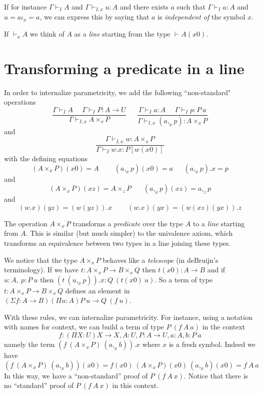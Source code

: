 \documentclass[10pt,a4paper]{article}
\begin{document}
 If for instance $\Gamma\vdash_I A$ and $\Gamma\vdash_{I,x} u:A$ and there exists $a$
such that $\Gamma\vdash_I a :A$ and $u = a\iota_x = a$, we can express this by saying that
$a$ is {\em independent of} the symbol $x$.

\medskip

 If $\vdash_{x} A$ we think of $A$ as a {\em line} starting from the type $\vdash_{} A(x0)$.

\section{Transforming a predicate in a line}


 In order to internalize parametricity, we add the following ``non-standard" operations
$$
\frac{\Gamma\vdash_I A~~~~~~\Gamma\vdash_I P:A\rightarrow U}{\Gamma\vdash_{I,x} A\times_x P}~~~~~~~
\frac{\Gamma\vdash_I a:A~~~~~~\Gamma\vdash_I p:P~a}{\Gamma\vdash_{I,x} (a,_xp):A\times_x P}
$$
and
$$
\frac{\Gamma\vdash_{I,x} w:A\times_x P}{\Gamma\vdash_I w.x:P[w(x0)]}
$$
with the defining equations 
$$
(A\times_x P)(x0) = A~~~~~~~~~~(a,_x p)(x0) = a~~~~~~~(a,_x p).x = p
$$
and
$$
(A\times_x P) (xz) = A\times_z P~~~~~~~~(a,_xp)(xz) = a,_z p
$$
and
$$
(w.x)(yz) = (w(yz)).x~~~~~~~~~~(w.x)(yx) = (w(xz)(yx)).z
$$

 The operation $A\times_x P$ transforms a {\em predicate} over the type $A$ to a {\em line}
starting from $A$. This is similar (but much simpler) to the univalence axiom, which transforms
an equivalence between two types in a line joining these types.

\medskip

 We notice that the type $A\times_x P$ behaves like a {\em telescope} (in deBruijn's terminology).
If we have $t:A\times_x P \rightarrow B\times_x Q$ then $t(x0):A\rightarrow B$
and if $u:A,~p:P~u$ then $(t~(u,_xp)).x:Q~(t(x0)~u)$. So a term of type
 $t:A\times_x P \rightarrow B\times_x Q$ defines an element in
$(\Sigma f:A\rightarrow B)(\Pi u:A)P~u\rightarrow Q~(f~u)$.

\medskip

 With these rules, we can internalize parametricity. For instance, using a notation with names
for context, we can build a term of type $P~(f~A~a)$ in the context
$$
f:(\Pi X:U)X\rightarrow X,A:U,P:A\rightarrow U,a:A,b:P~a
$$
namely the term $(f~(A\times _x P)~(a,_x b)).x$ where $x$ is a fresh symbol. Indeed we have
$$(f~(A\times _x P)~(a,_x b))(x0) = f(x0)~(A\times_x P)(x0)~(a,_xb)(x0) = f~A~a$$
In this way, we have a ``non-standard''
proof of $P~(f~A~x)$. Notice that there is no ``standard'' proof of $P~(f~A~x)$ in this context.
\end{document}
